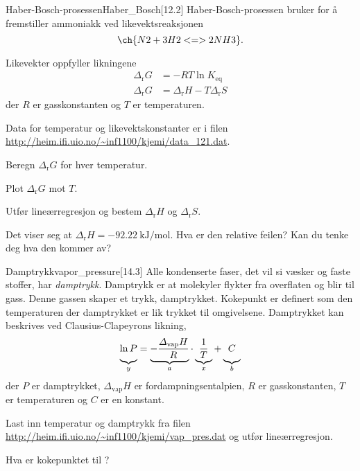 \begin{exercise}{Haber-Bosch-prosessen}{Haber_Bosch}[12.2]
	Haber-Bosch-prosessen bruker for å fremstiller ammoniakk ved likevektsreaksjonen
	\begin{equation*}
	\ch{N2+3H2<=>2NH3}.
	\end{equation*}
	
	Likevekter oppfyller likningene
	\begin{align*}
	\Delta_\mathrm{r}G&=-RT\ln K_\mathrm{eq}\\
	\Delta_\mathrm{r}G&=\Delta_\mathrm{r}H-T\Delta_\mathrm{r}S
	\end{align*}
	der $R$ er gasskonstanten og $T$ er temperaturen.
	
	Data for temperatur og likevektskonstanter er i filen \url{http://heim.ifi.uio.no/~inf1100/kjemi/data_121.dat}.
	
	\subexercise Beregn $\Delta_\mathrm{r}G$ for hver temperatur.
	
	\subexercise Plot $\Delta_\mathrm{r}G$ mot $T$.
	
	\subexercise Utfør lineærregresjon og bestem $\Delta_\mathrm{r}H$ og $\Delta_\mathrm{r}S$.
	
	\subexercise Det viser seg at $\Delta_\mathrm{r}H=\SI{-92,22}{\kilo\joule\per\mole}$. Hva er den relative feilen? Kan du tenke deg hva den kommer av?
\end{exercise}

\begin{exercise}{Damptrykk}{vapor_pressure}[14.3]
	Alle kondenserte faser, det vil si væsker og faste stoffer, har \emph{damptrykk}. Damptrykk er at molekyler flykter fra overflaten og blir til gass. Denne gassen skaper et trykk, damptrykket. Kokepunkt er definert som den temperaturen der damptrykket er lik trykket til omgivelsene. Damptrykket kan beskrives ved Clausius-Clapeyrons likning,
	\begin{equation*}
	\underbrace{\ln P\vphantom{\frac11}}_y = \underbrace{- \frac{\Delta_\text{vap}H}{R}}_a\cdot\underbrace{\frac{1}{T}}_x+\underbrace{C\vphantom{\frac11}}_b 
	\end{equation*}
	der $P$ er damptrykket, $\Delta_{\text{vap}}H$ er fordampningsentalpien, $R$ er gasskonstanten, $T$ er temperaturen og $C$ er en konstant.
	
	\subexercise Last inn temperatur og damptrykk fra filen	\url{http://heim.ifi.uio.no/~inf1100/kjemi/vap_pres.dat} og utfør lineærregresjon.
	
	\subexercise Hva er kokepunktet til ?
\end{exercise}


